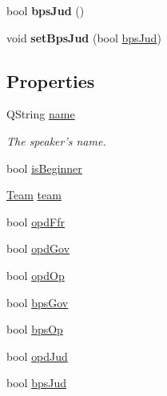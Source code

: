 \begin{DoxyCompactItemize}
\item 
\hypertarget{classSpeakerModel_a2a81c984fd5b2600088d6d33950972bd}{bool {\bfseries bps\-Jud} ()}\label{classSpeakerModel_a2a81c984fd5b2600088d6d33950972bd}

\item 
\hypertarget{classSpeakerModel_ade12da992153e28d6876b89f20697b7e}{void {\bfseries set\-Bps\-Jud} (bool \hyperlink{classSpeakerModel_a60f2670dcde9e6dbe24661599e6b674c}{bps\-Jud})}\label{classSpeakerModel_ade12da992153e28d6876b89f20697b7e}

\end{DoxyCompactItemize}
\subsection*{Properties}
\begin{DoxyCompactItemize}
\item 
\hypertarget{classSpeakerModel_a9727f89c2cc146a2d9959d2e692aa444}{Q\-String \hyperlink{classSpeakerModel_a9727f89c2cc146a2d9959d2e692aa444}{name}}\label{classSpeakerModel_a9727f89c2cc146a2d9959d2e692aa444}

\begin{DoxyCompactList}\small\item\em The speaker's name. \end{DoxyCompactList}\item 
bool \hyperlink{classSpeakerModel_a47d41be22317dd22fd7aec6240c731cf}{is\-Beginner}
\item 
\hyperlink{classTeam}{Team} \hyperlink{classSpeakerModel_a2b6725ebf62712e76c559443426144b1}{team}
\item 
bool \hyperlink{classSpeakerModel_ae7ddef47cf54a9ace7c2399c7a18049d}{opd\-Ffr}
\item 
bool \hyperlink{classSpeakerModel_a7a7dafddf0d9f0bb60e5e138277b50fd}{opd\-Gov}
\item 
bool \hyperlink{classSpeakerModel_a60ebe1609153ba734e8d5449643cd85e}{opd\-Op}
\item 
bool \hyperlink{classSpeakerModel_aaf2dd2737f827659f7ca2a8a6b8a87f3}{bps\-Gov}
\item 
bool \hyperlink{classSpeakerModel_a2f2cac7000658283ccf8d06683b64376}{bps\-Op}
\item 
bool \hyperlink{classSpeakerModel_a427f9e7d98bcbaea06f395eb82271a56}{opd\-Jud}
\item 
bool \hyperlink{classSpeakerModel_a60f2670dcde9e6dbe24661599e6b674c}{bps\-Jud}
\end{DoxyCompactItemize}



